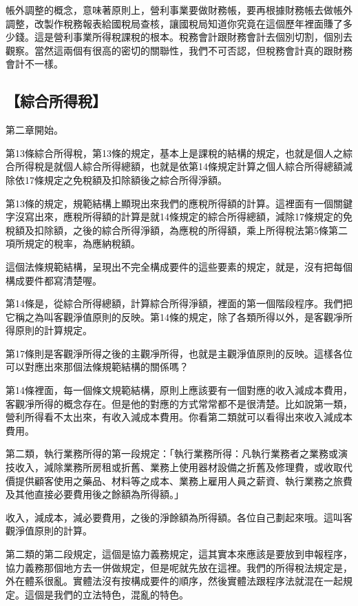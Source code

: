 \documentclass[oneside,sub3section]{ctexbook}
\begin{document}
帳外調整的概念，意味著原則上，營利事業要做財務帳，要再根據財務帳去做帳外調整，改製作稅務報表給國稅局查核，讓國稅局知道你究竟在這個歷年裡面賺了多少錢。這是營利事業所得稅課稅的根本。稅務會計跟財務會計去個別切割，個別去觀察。當然這兩個有很高的密切的關聯性，我們不可否認，但稅務會計真的跟財務會計不一樣。

\hypertarget{ux7d9cux5408ux6240ux5f97ux7a05}{%
\subsection{【綜合所得稅】}\label{ux7d9cux5408ux6240ux5f97ux7a05}}

第二章開始。

第13條綜合所得稅，第13條的規定，基本上是課稅的結構的規定，也就是個人之綜合所得稅是就個人綜合所得總額，也就是依第14條規定計算之個人綜合所得總額減除依17條規定之免稅額及扣除額後之綜合所得淨額。

第13條的規定，規範結構上顯現出來我們的應稅所得額的計算。這裡面有一個關鍵字沒寫出來，應稅所得額的計算是就14條規定的綜合所得總額，減除17條規定的免稅額及扣除額，之後的綜合所得淨額，為應稅的所得額，乘上所得稅法第5條第二項所規定的稅率，為應納稅額。

這個法條規範結構，呈現出不完全構成要件的這些要素的規定，就是，沒有把每個構成要件都寫清楚喔。

第14條是，從綜合所得總額，計算綜合所得淨額，裡面的第一個階段程序。我們把它稱之為叫客觀淨值原則的反映。第14條的規定，除了各類所得以外，是客觀凈所得原則的計算規定。

第17條則是客觀淨所得之後的主觀凈所得，也就是主觀淨值原則的反映。這樣各位可以對應出來那個法條規範結構的關係嗎？

第14條裡面，每一個條文規範結構，原則上應該要有一個對應的收入減成本費用，客觀凈所得的概念存在。但是他的對應的方式常常都不是很清楚。比如說第一類，營利所得看不太出來，有收入減成本費用。你看第二類就可以看得出來收入減成本費用。

第二類，執行業務所得的第一段規定：「執行業務所得：凡執行業務者之業務或演技收入，減除業務所房租或折舊、業務上使用器材設備之折舊及修理費，或收取代價提供顧客使用之藥品、材料等之成本、業務上雇用人員之薪資、執行業務之旅費及其他直接必要費用後之餘額為所得額。」

收入，減成本，減必要費用，之後的淨餘額為所得額。各位自己劃起來哦。這叫客觀淨值原則的計算。

第二類的第二段規定，這個是協力義務規定，這其實本來應該是要放到申報程序，協力義務那個地方去一併做規定，但是呢就先放在這裡。我們的所得稅法規定是，外在體系很亂。實體法沒有按構成要件的順序，然後實體法跟程序法就混在一起規定。這個是我們的立法特色，混亂的特色。
\end{document}

